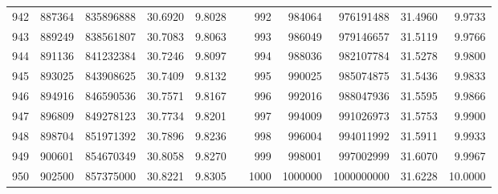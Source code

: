 \begin{longtable}{rrrrrrrrrrr}
942&887364&835896888&30.6920&9.8028&&992&984064&976191488&31.4960&9.9733\\
943&889249&838561807&30.7083&9.8063&&993&986049&979146657&31.5119&9.9766\\
944&891136&841232384&30.7246&9.8097&&994&988036&982107784&31.5278&9.9800\\
945&893025&843908625&30.7409&9.8132&&995&990025&985074875&31.5436&9.9833\\
946&894916&846590536&30.7571&9.8167&&996&992016&988047936&31.5595&9.9866\\
947&896809&849278123&30.7734&9.8201&&997&994009&991026973&31.5753&9.9900\\
948&898704&851971392&30.7896&9.8236&&998&996004&994011992&31.5911&9.9933\\
949&900601&854670349&30.8058&9.8270&&999&998001&997002999&31.6070&9.9967\\
950&902500&857375000&30.8221&9.8305&&1000&1000000&1000000000&31.6228&10.0000\\
\end{longtable}
